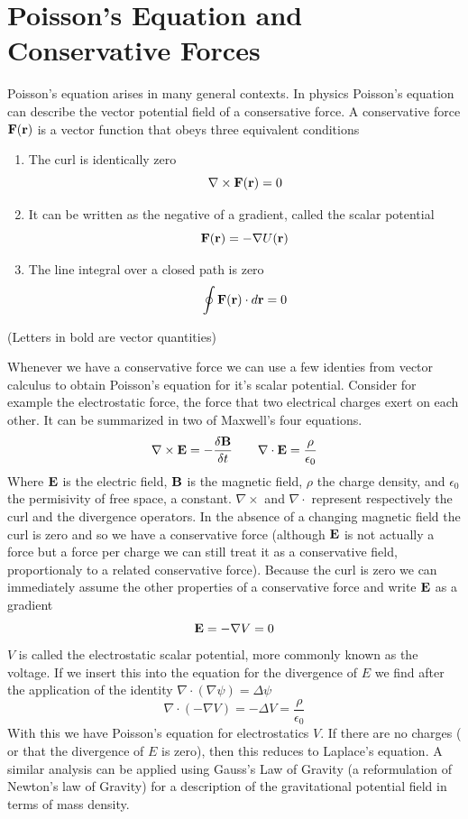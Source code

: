 \section{Poisson's Equation and Conservative Forces}
Poisson's equation arises in many general contexts. In physics Poisson's equation can describe the vector potential field of a consersative force. A conservative force $\bold{F}(\bold{r})$ is a vector function that obeys three equivalent conditions
\begin{enumerate}
	\item The curl is identically zero
			\[ \nabla \times \bold{F}(\bold{r}) = 0\]
	\item It can be written as the negative of a gradient, called the scalar potential
			\[ \bold{F}(\bold{r}) = - \nabla U(\bold{r}) \]
	\item The line integral over a closed path is zero
			\[ \oint \bold{F}(\bold{r}) \cdot d\bold{r} = 0 \]

\end{enumerate}
(Letters in bold are vector quantities)


Whenever we have a conservative force we can use a few identies from vector calculus to obtain Poisson's equation for it's scalar potential. 
Consider for example the electrostatic force, the force that two electrical charges exert on each other. 
It can be summarized in two of Maxwell's four equations.
\[
\nabla \times \bold{E} = -\frac{\delta \bold{B} } {\delta t} \qquad
\nabla \cdot \bold{E} = \frac{\rho}{\epsilon_0}
\]
Where $\bold{E}$ is the electric field, $\bold{B}$ is the magnetic field, $\rho$ the charge density, and $\epsilon_0$ the permisivity of free space, a constant. $\nabla \times$ and $\nabla \cdot$ represent respectively the curl and the divergence operators. In the absence of a changing magnetic field the curl is zero and so we have a conservative force (although $\bold{E}$ is not actually a force but a force per charge we can still treat it as a conservative field, proportionaly to a related conservative force). Because the curl is zero we can immediately assume the other properties of a conservative force and write $\bold{E}$ as a gradient
\[
\bold{E}  = - \nabla V = 0
\]
$V$ is called the electrostatic scalar potential, more commonly known as the voltage. 
If we insert this into the equation for the divergence of $E$ we find after the application of the identity $\nabla \cdot (\nabla\psi) = \Delta \psi$
\[
\nabla \cdot ( - \nabla V) = - \Delta V = \frac {\rho}{\epsilon_0}
\]
With this we have Poisson's equation for electrostatics $V$. 
If there are no charges ( or that the divergence of $E$ is zero), then this reduces to Laplace's equation. 
A similar analysis can be applied using Gauss's Law of Gravity (a reformulation of Newton's law of Gravity) for a description of the gravitational potential field in terms of mass density.

